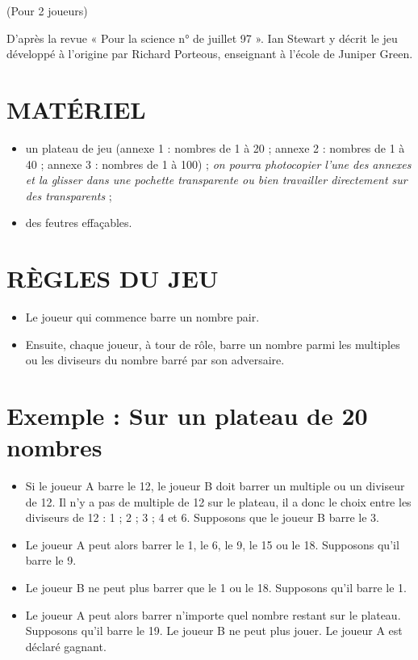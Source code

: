 
\begin{center}
(Pour 2 joueurs)
\end{center}

\noindent
D’après la revue « Pour la science n° de juillet 97 ». Ian Stewart y décrit le jeu développé à l’origine par Richard Porteous, enseignant à l’école de Juniper Green.

\section*{MATÉRIEL}
\begin{itemize}
    \item un plateau de jeu (annexe 1 : nombres de 1 à 20 ; annexe 2 : nombres de 1 à 40 ; annexe 3 : nombres de 1 à 100) ; \textit{on pourra photocopier l’une des annexes et la glisser dans une pochette transparente ou bien travailler directement sur des transparents} ;
    \item des feutres effaçables.
\end{itemize}

\section*{RÈGLES DU JEU}
\begin{itemize}
    \item Le joueur qui commence barre un nombre pair.
    \item Ensuite, chaque joueur, à tour de rôle, barre un nombre parmi les multiples ou les diviseurs du nombre barré par son adversaire.
\end{itemize}

\noindent
{}

\section*{Exemple : Sur un plateau de 20 nombres}
\begin{itemize}
    \item Si le joueur A barre le 12, le joueur B doit barrer un multiple ou un diviseur de 12. Il n’y a pas de multiple de 12 sur le plateau, il a donc le choix entre les diviseurs de 12 : 1 ; 2 ; 3 ; 4 et 6. Supposons que le joueur B barre le 3.
    \item Le joueur A peut alors barrer le 1, le 6, le 9, le 15 ou le 18. Supposons qu’il barre le 9.
    \item Le joueur B ne peut plus barrer que le 1 ou le 18. Supposons qu’il barre le 1.
    \item Le joueur A peut alors barrer n’importe quel nombre restant sur le plateau. Supposons qu’il barre le 19. Le joueur B ne peut plus jouer. Le joueur A est déclaré gagnant.
\end{itemize}


